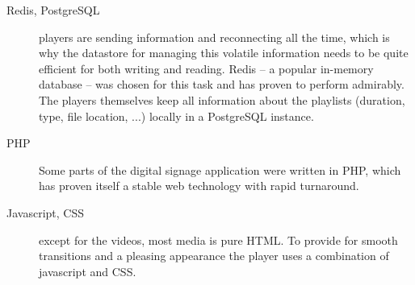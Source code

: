\documentclass[]{friggeri-cv}
\begin{document}
\begin{entrylist}
{{\begin{description}
        \item[Redis, PostgreSQL] players are sending information and reconnecting all the time, which is why the datastore for managing this volatile information needs to be quite efficient for both writing and reading. Redis -- a popular in-memory database -- was chosen for this task and has proven to perform admirably. The players themselves keep all information about the playlists (duration, type, file location, ...) locally in a PostgreSQL instance.
        \item[PHP] Some parts of the digital signage application were written in PHP, which has proven itself a stable web technology with rapid turnaround.
        \item[Javascript, CSS] except for the videos, most media is pure HTML. To provide for smooth transitions and a pleasing appearance the player uses a combination of javascript and CSS.
    \end{description}
    }}
\end{entrylist}
\end{document}
